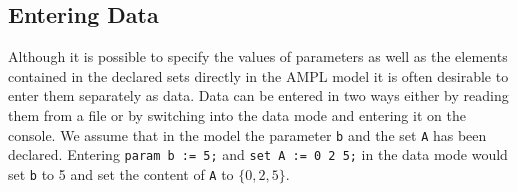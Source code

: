 \subsection{Entering Data}
Although it is possible to specify the values of parameters as well as the elements contained in the declared sets directly in the AMPL model it is often desirable to enter them separately as data. Data can be entered in two ways either by reading them from a file or by switching into the data mode and entering it on the console. We assume that in the model the parameter \verb=b= and the set \verb=A= has been declared. Entering \verb&param b := 5;& and \verb&set A := 0 2 5;& in the data mode would set \verb=b= to 5 and set the content of \verb=A= to $\lbrace 0,2,5\rbrace$.
%

